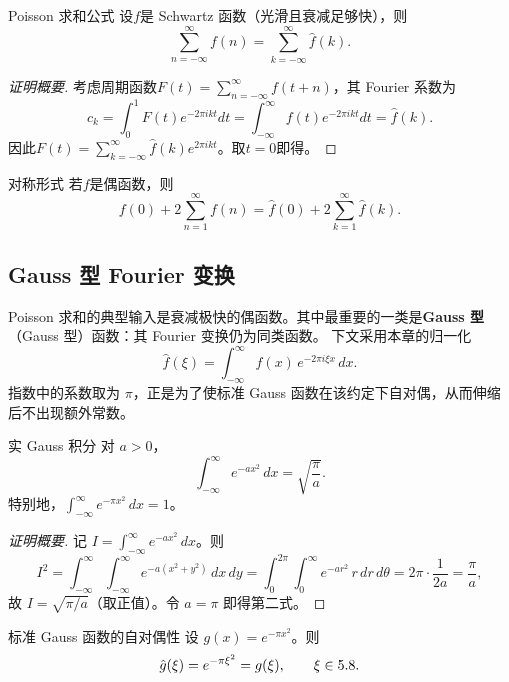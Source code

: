 \begin{theorem}{Poisson 求和公式}{}
设$f$是 Schwartz 函数（光滑且衰减足够快），则
\[
\sum_{n=-\infty}^{\infty} f(n) = \sum_{k=-\infty}^{\infty} \hat{f}(k).
\]
\end{theorem}

\begin{proof}[证明概要]
考虑周期函数$F(t)=\sum_{n=-\infty}^{\infty}f(t+n)$，其 Fourier 系数为
\[
c_k = \int_0^1 F(t) e^{-2\pi i k t} dt = \int_{-\infty}^{\infty} f(t) e^{-2\pi i k t} dt = \hat{f}(k).
\]
因此$F(t)=\sum_{k=-\infty}^{\infty}\hat{f}(k)e^{2\pi i k t}$。取$t=0$即得。
\end{proof}

\begin{corollary}{对称形式}{}
若$f$是偶函数，则
\[
f(0) + 2\sum_{n=1}^{\infty} f(n) = \hat{f}(0) + 2\sum_{k=1}^{\infty} \hat{f}(k).
\]
\end{corollary}

\subsection{Gauss 型 Fourier 变换}\label{subsec:gauss_ft}

Poisson 求和的典型输入是衰减极快的偶函数。其中最重要的一类是\textbf{Gauss 型}（Gauss 型）函数：其 Fourier 变换仍为同类函数。
下文采用本章的归一化
\[
\hat{f}(\xi) = \int_{-\infty}^{\infty} f(x)\, e^{-2\pi i \xi x}\, dx.
\]
指数中的系数取为 $\pi$，正是为了使标准 Gauss 函数在该约定下自对偶，从而伸缩后不出现额外常数。

\begin{lemma}{实 Gauss 积分}{}
对 $a>0$，
\[
\int_{-\infty}^{\infty} e^{-a x^2}\, dx = \sqrt{\frac{\pi}{a}}.
\]
特别地，$\int_{-\infty}^{\infty} e^{-\pi x^2}\, dx = 1$。
\end{lemma}

\begin{proof}[证明概要]
记 $I=\int_{-\infty}^{\infty} e^{-a x^2}\, dx$。则
\[
I^2 = \int_{-\infty}^{\infty}\!\int_{-\infty}^{\infty} e^{-a(x^2+y^2)}\,dx\,dy
= \int_0^{2\pi}\!\int_0^{\infty} e^{-a r^2}\, r\,dr\,d\theta
= 2\pi\cdot\frac{1}{2a} = \frac{\pi}{a},
\]
故 $I=\sqrt{\pi/a}$（取正值）。令 $a=\pi$ 即得第二式。
\end{proof}

\begin{theorem}{标准 Gauss 函数的自对偶性}{}\label{thm:gaussian_self_dual}
设 $g(x)=e^{-\pi x^2}$。则
\[
\hat{g}(\xi) = e^{-\pi \xi^2} = g(\xi), \qquad \xi\in5.8.
\]
\end{theorem}

